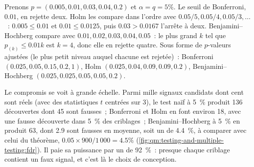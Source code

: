 \begin{example}\label{ex:qm:testing-and-multiple-testing:five}
Prenons $p = (0.005, 0.01, 0.03, 0.04, 0.2)$ et $\alpha = q = 5\%$. Le seuil de Bonferroni, $0.01$, en rejette deux. Holm les compare dans
l'ordre avec $0.05/5, 0.05/4, 0.05/3, \dots$~: $0.005 \le 0.01$ et $0.01 \le 0.0125$, puis $0.03 > 0.0167$ l'arrête à deux. Benjamini--Hochberg
compare avec $0.01, 0.02, 0.03, 0.04, 0.05$~: le plus grand $k$ tel que $p_{(k)} \le 0.01k$ est $k = 4$, donc elle en rejette quatre. Sous forme de
$p$-valeurs ajustées (le plus petit niveau auquel chacune est rejetée)~: Bonferroni $(0.025, 0.05, 0.15, 0.2, 1)$, Holm $(0.025, 0.04, 0.09, 0.09, 0.2)$,
Benjamini--Hochberg $(0.025, 0.025, 0.05, 0.05, 0.2)$.
\end{example}

Le compromis se voit à grande échelle. Parmi mille signaux candidats dont cent sont réels (avec des statistiques $t$ centrées sur 3), le
test naïf à 5~\% produit 136 découvertes dont 45 sont fausses~; Bonferroni et Holm en font environ 18, avec une fausse découverte dans 5~\% des
criblages~; Benjamini--Hochberg à 5~\% en produit 63, dont 2.9 sont fausses en moyenne, soit un  de 4.4~\%, à comparer avec
celui du théorème, $0.05 \times 900/1\,000 = 4.5\%$ (\cref{fig:qm:testing-and-multiple-testing:fdr}). Il paie sa puissance par un  de 92~\%~:
presque chaque criblage contient un faux signal, et c'est là le choix de conception.

\begin{omfigure}

\label{fig:qm:testing-and-multiple-testing:fdr}
\end{omfigure}

